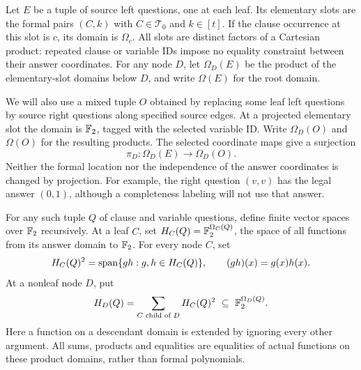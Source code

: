 Let $E$ be a tuple of source left questions, one at each leaf.  Its elementary slots
are the formal pairs $(C,k)$ with $C\in\mathcal T_0$ and $k\in[t]$.
If the clause occurrence at this slot is $c$, its domain is $\Omega_c$.
All slots are distinct factors of a Cartesian product: repeated clause or
variable IDs impose no equality constraint between their answer coordinates.
For any node $D$, let $\Omega_D(E)$ be the product of the elementary-slot
domains below $D$, and write $\Omega(E)$ for the root domain.

We will also use a mixed tuple $O$ obtained by replacing some leaf left
questions by source right questions along specified source edges.
At a projected elementary slot the domain is $\mathbb F_2$, tagged with the selected
variable ID.  Write $\Omega_D(O)$ and $\Omega(O)$ for the resulting products.
The selected coordinate maps give a surjection
\[
 \pi_D:\Omega_D(E)\longrightarrow\Omega_D(O).
\]
Neither the formal location nor the independence of the answer coordinates
is changed by projection.  For example, the right question $(v,v)$ has the
legal answer $(0,1)$, although a completeness labeling will not use that
answer.

\begin{definition}\label{def:spaces}
For any such tuple $Q$ of clause and variable questions, define finite
vector spaces over $\mathbb F_2$ recursively.  At a leaf $C$, set
$H_C(Q)=\mathbb F_2^{\Omega_C(Q)}$, the space of all functions from its answer domain
to $\mathbb F_2$.  For every node $C$, set
\[
 H_C(Q)^2=\operatorname{span}\{gh:g,h\in H_C(Q)\},
 \qquad (gh)(x)=g(x)h(x).
\]
At a nonleaf node $D$, put
\begin{equation}\label{eq:construction-spaces}
 H_D(Q)=\sum_{C\text{ child of }D} H_C(Q)^2
       \ \subseteq\ \mathbb F_2^{\Omega_D(Q)}.
\end{equation}
Here a function on a descendant domain is extended by ignoring every
other argument.  All sums, products and equalities are equalities of actual
functions on these product domains, rather than formal polynomials.
\end{definition}


